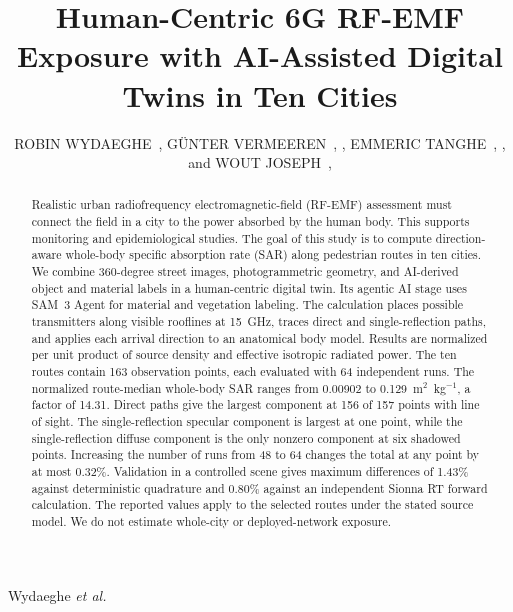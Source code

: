 \documentclass{IEEEoj}
\providecommand{\DIFdel}[1]{{\protect\color{red} \scriptsize #1}} %
\providecommand{\DIFdelbegin}{} %
\providecommand{\DIFdelend}{} %
\begin{document}

\title{Human-Centric 6G RF-EMF Exposure with AI-Assisted Digital Twins in Ten Cities}

\author{ROBIN WYDAEGHE~,
G\"UNTER VERMEEREN~,
,
EMMERIC TANGHE~,
,
and WOUT JOSEPH~,
}



{Wydaeghe \textit{et al.}}

\begin{abstract}
Realistic urban radiofrequency electromagnetic-field (RF-EMF) assessment must
connect the field in a city to the power absorbed by the human body. This
supports monitoring and epidemiological studies. The goal of
this study is to compute direction-aware whole-body specific absorption rate
(SAR) along pedestrian routes in ten cities. We combine 360-degree street
images, photogrammetric geometry, and AI-derived object and material labels in
a human-centric digital twin. Its agentic AI stage uses SAM~3 Agent for
material and vegetation labeling. The calculation places possible transmitters
along visible rooflines at 15~GHz, traces direct and single-reflection paths,
and applies each arrival direction to an anatomical body model. Results are
normalized per unit product of source density and effective isotropic radiated
power. The ten routes contain 163 observation points, each evaluated with 64
independent runs. The normalized route-median whole-body SAR ranges from
0.00902 to 0.129~m$^2$~kg$^{-1}$, a factor of 14.31. Direct paths give the
largest component at 156 of 157 points with line of sight. The single-reflection
specular component is largest at one point, while the single-reflection diffuse component is
the only nonzero component at six shadowed points. Increasing the number of
runs from 48 to 64 changes the total at any point by at most 0.32\%. Validation
in a controlled scene gives maximum differences of 1.43\% against deterministic
quadrature and 0.80\% against an independent Sionna RT forward calculation.
The reported values apply to the selected routes under the stated source model.
\DIFdelbegin \DIFdel{We do not estimate whole-city or deployed-network exposure.
}\DIFdelend \end{abstract}
\end{document}
